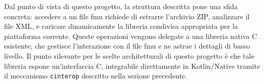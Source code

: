 Dal punto di vista di questo progetto, la struttura descritta pone una sfida concreta: accedere a un file \ac{fmu} richiede di estrarre l'archivio ZIP, analizzare il file XML, e caricare dinamicamente la libreria condivisa appropriata per la piattaforma corrente. Queste operazioni vengono delegate a una libreria nativa C esistente, che gestisce l'interazione con il file \ac{fmu} e ne astrae i dettagli di basso livello. Il punto rilevante per le scelte architetturali di questo progetto è che tale libreria espone un'interfaccia C, integrabile direttamente in Kotlin/Native tramite il meccanismo \texttt{cinterop} descritto nella sezione precedente.